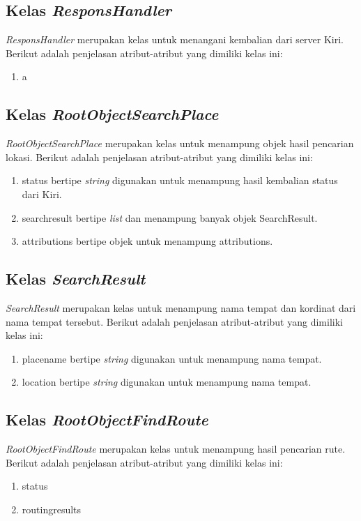 \subsection{Kelas \textit{ResponsHandler}}
\label{lab:Kelas ResponsHandler}
\hspace{0.5cm} \textit{ResponsHandler} merupakan kelas untuk menangani kembalian dari server Kiri. Berikut adalah penjelasan atribut-atribut yang dimiliki kelas ini:
\begin{enumerate}
	\item a
\end{enumerate}

\subsection{Kelas \textit{RootObjectSearchPlace}}
\label{lab:Kelas RootObjectSearchPlace}
\hspace{0.5cm} \textit{RootObjectSearchPlace} merupakan kelas untuk menampung objek hasil pencarian lokasi. Berikut adalah penjelasan atribut-atribut yang dimiliki kelas ini:
\begin{enumerate}
	\item status bertipe \textit{string} digunakan untuk menampung hasil kembalian status dari Kiri.
	\item searchresult bertipe \textit{list} dan menampung banyak objek SearchResult. 
	\item attributions bertipe objek untuk menampung attributions.
\end{enumerate}


\subsection{Kelas \textit{SearchResult}}
\label{lab:Kelas SearchResult}
\hspace{0.5cm} \textit{SearchResult} merupakan kelas untuk menampung nama tempat dan kordinat dari nama tempat tersebut. Berikut adalah penjelasan atribut-atribut yang dimiliki kelas ini:
\begin{enumerate}
	\item placename bertipe \textit{string} digunakan untuk menampung nama tempat. 
	\item location bertipe \textit{string} digunakan untuk menampung nama tempat.
\end{enumerate}

\subsection{Kelas \textit{RootObjectFindRoute}}
\label{lab:Kelas RootObjectFindRoute}
\hspace{0.5cm} \textit{RootObjectFindRoute} merupakan kelas untuk menampung hasil pencarian rute. Berikut adalah penjelasan atribut-atribut yang dimiliki kelas ini:
\begin{enumerate}
	\item status
	\item routingresults
\end{enumerate}

